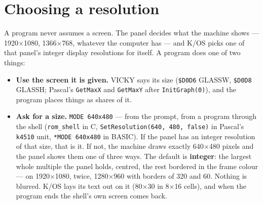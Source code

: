 \section{Choosing a resolution}\label{sec:resolution}
A program never assumes a screen. The panel decides what the machine
shows --- 1920$\times$1080, 1366$\times$768, whatever the computer has --- and
K/OS picks one of that panel's integer display resolutions for itself. A
program does one of two things:

\begin{itemize}[leftmargin=1.4em]
\item \textbf{Use the screen it is given.} VICKY says its size
  (\texttt{\$D0D6} GLASSW, \texttt{\$D0D8} GLASSH; Pascal's
  \verb|GetMaxX| and \verb|GetMaxY| after \verb|InitGraph(0)|), and the
  program places things as shares of it.
\item \textbf{Ask for a size.} \verb|MODE 640x480| --- from the prompt, from
  a program through the shell (\verb|rom_shell| in C, \verb|SetResolution(640, 480, false)| in Pascal's \verb|k4510| unit, \verb|*MODE 640x480| in
  BASIC). If the panel has an integer resolution of that size, that is
  it. If not, the machine draws exactly 640$\times$480 pixels and the
  panel shows them one of three ways. The default is \textbf{integer}:
  the largest whole multiple the panel holds, centred, the rest bordered
  in the frame colour --- on 1920$\times$1080, twice, 1280$\times$960 with
  borders of 320 and 60. Nothing is blurred.
  K/OS lays its text out on it (80$\times$30 in 8$\times$16 cells), and when
  the program ends the shell's own screen comes back.
\end{itemize}

